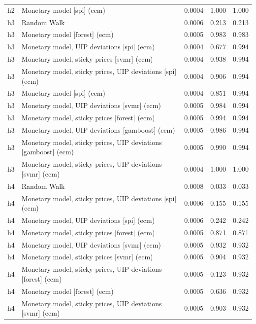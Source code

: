 \begin{ThreePartTable}
\begin{longtable}[t]{cp{5.5cm}ccc}
h2 & \raggedright Monetary model [spi] (ecm) & 0.0004 & 1.000 & 1.000\\
\addlinespace
h3 & \raggedright Random Walk & 0.0006 & 0.213 & 0.213\\
h3 & \raggedright Monetary model [forest] (ecm) & 0.0005 & 0.983 & 0.983\\
h3 & \raggedright Monetary model, UIP deviations [spi] (ecm) & 0.0004 & 0.677 & 0.994\\
h3 & \raggedright Monetary model, sticky prices [svmr] (ecm) & 0.0004 & 0.938 & 0.994\\
h3 & \raggedright Monetary model, sticky prices, UIP deviations [spi] (ecm) & 0.0004 & 0.906 & 0.994\\
h3 & \raggedright Monetary model [spi] (ecm) & 0.0004 & 0.851 & 0.994\\
h3 & \raggedright Monetary model, UIP deviations [svmr] (ecm) & 0.0005 & 0.984 & 0.994\\
h3 & \raggedright Monetary model, sticky prices [forest] (ecm) & 0.0005 & 0.994 & 0.994\\
h3 & \raggedright Monetary model, UIP deviations [gamboost] (ecm) & 0.0005 & 0.986 & 0.994\\
h3 & \raggedright Monetary model, sticky prices, UIP deviations [gamboost] (ecm) & 0.0005 & 0.990 & 0.994\\
h3 & \raggedright Monetary model, sticky prices, UIP deviations [svmr] (ecm) & 0.0004 & 1.000 & 1.000\\
\addlinespace
h4 & \raggedright Random Walk & 0.0008 & 0.033 & 0.033\\
h4 & \raggedright Monetary model, sticky prices, UIP deviations [spi] (ecm) & 0.0006 & 0.155 & 0.155\\
h4 & \raggedright Monetary model, UIP deviations [spi] (ecm) & 0.0006 & 0.242 & 0.242\\
h4 & \raggedright Monetary model, sticky prices [forest] (ecm) & 0.0005 & 0.871 & 0.871\\
h4 & \raggedright Monetary model, UIP deviations [svmr] (ecm) & 0.0005 & 0.932 & 0.932\\
h4 & \raggedright Monetary model, sticky prices [svmr] (ecm) & 0.0005 & 0.904 & 0.932\\
h4 & \raggedright Monetary model, sticky prices, UIP deviations [forest] (ecm) & 0.0005 & 0.123 & 0.932\\
h4 & \raggedright Monetary model [forest] (ecm) & 0.0005 & 0.636 & 0.932\\
h4 & \raggedright Monetary model, sticky prices, UIP deviations [svmr] (ecm) & 0.0005 & 0.903 & 0.932\\

\end{longtable}
\end{ThreePartTable}
